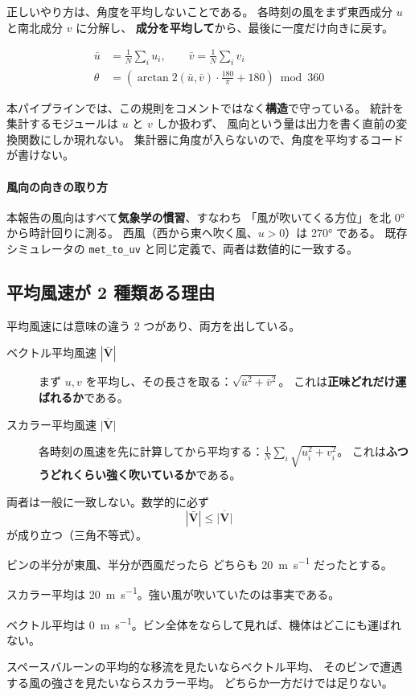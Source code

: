 正しいやり方は、角度を平均しないことである。
各時刻の風をまず東西成分 $u$ と南北成分 $v$ に分解し、
\textbf{成分を平均して}から、最後に一度だけ向きに戻す。

\begin{align}
  \bar{u} &= \frac{1}{N}\sum_i u_i, \qquad \bar{v} = \frac{1}{N}\sum_i v_i \\
  \theta &= \left(\arctan2(\bar{u}, \bar{v}) \cdot \frac{180}{\pi} + 180\right) \bmod 360
\end{align}

本パイプラインでは、この規則をコメントではなく\textbf{構造}で守っている。
統計を集計するモジュールは $u$ と $v$ しか扱わず、
風向という量は出力を書く直前の変換関数にしか現れない。
集計器に角度が入らないので、角度を平均するコードが書けない。

\paragraph{風向の向きの取り方}
本報告の風向はすべて\textbf{気象学の慣習}、すなわち
「風が吹いてくる方位」を北 \ang{0} から時計回りに測る。
西風（西から東へ吹く風、$u > 0$）は \ang{270} である。
既存シミュレータの \texttt{met\_to\_uv} と同じ定義で、両者は数値的に一致する。

\subsection{平均風速が 2 種類ある理由}
\label{sec:twomeans}

平均風速には意味の違う 2 つがあり、両方を出している。

\begin{description}
  \item[ベクトル平均風速 $|\bar{\mathbf{V}}|$]
    まず $u, v$ を平均し、その長さを取る：$\sqrt{\bar{u}^2 + \bar{v}^2}$。
    これは\textbf{正味どれだけ運ばれるか}である。
  \item[スカラー平均風速 $\overline{|\mathbf{V}|}$]
    各時刻の風速を先に計算してから平均する：$\frac{1}{N}\sum_i \sqrt{u_i^2 + v_i^2}$。
    これは\textbf{ふつうどれくらい強く吹いているか}である。
\end{description}

両者は一般に一致しない。数学的に必ず
\begin{equation}
  |\bar{\mathbf{V}}| \le \overline{|\mathbf{V}|}
\end{equation}
が成り立つ（三角不等式）。

\begin{whybox}{ビンの半分が東風、半分が西風だったら}
どちらも \SI{20}{\metre\per\second} だったとする。

スカラー平均は \SI{20}{\metre\per\second}。強い風が吹いていたのは事実である。

ベクトル平均は \SI{0}{\metre\per\second}。ビン全体をならして見れば、機体はどこにも運ばれない。

スペースバルーンの平均的な移流を見たいならベクトル平均、
そのビンで遭遇する風の強さを見たいならスカラー平均。
どちらか一方だけでは足りない。
\end{whybox}

